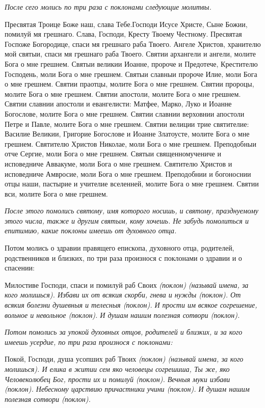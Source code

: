 \itshape После сего молись по три раза с поклонами следующие молитвы.\normalfont{}


Пресвятая Троице Боже наш, слава Тебе.Господи Исусе Христе, Сыне Божии, помилуй мя грешнаго. Слава, Господи, Кресту Твоему Честному. Пресвятая Госпоже Богородице, спаси мя грешнаго раба Твоего. Ангеле Христов, хранителю мой святыи, спаси мя грешнаго раба Твоего. Святии архангели и ангели, молите Бога о мне грешнем. Святыи великии Иоанне, пророче и Предотече, Крестителю Господень, моли Бога о мне грешнем. Святыи славныи пророче Илие, моли Бога о мне грешнем. Святии праотцы, молите Бога о мне грешнем. Святии пророцы, молите Бога о мне грешнем. Святии апостоли, молите Бога о мне грешнем. Святии славнии апостоли и евангелисти: Матфее, Марко, Луко и Иоанне Богослове, молите Бога о мне грешнем. Святии славнии верховнии апостоли Петре и Павле, молите Бога о мне грешнем. Святии велиции трие святителие: Василие Великии, Григорие Богослове и Иоанне Златоусте, молите Бога о мне грешнем. Святителю Христов Николае, моли Бога о мне грешнем. Преподобныи отче Сергие, моли Бога о мне грешнем. Святыи священномучениче и исповедниче Аввакуме, моли Бога о мне грешнем. Святителю Христов и исповедниче Амвросие, моли Бога о мне грешнем. Преподобнии и богоноснии отцы наши, пастырие и учителие вселенней, молите Бога о мне грешнем. Святии вси, молите Бога о мне грешнем.


\itshape После этого помолись святому, имя которого носишь, и святому, празднуемому этого числа, также и другим святым, кому хочешь. Не забудь помолиться и епитимию, какие поклоны имеешь от духовного отца.\normalfont{}


Потом молись о здравии правящего епископа, духовного отца, родителей, родственников и близких, по три раза произнося с поклонами о здравии и о спасении:


Милостиве Господи, спаси и помилуй раб Своих \itshape (поклон) (называй имена, за кого молишься)\normalfont{}. Избави их от всякия скорби, гнева и нужды \itshape (поклон)\normalfont{}. От всякия болезни душевныя и телесныя \itshape (поклон)\normalfont{}. И прости им всякое согрешение, вольное и невольное \itshape (поклон)\normalfont{}. И душам нашим полезная сотвори \itshape (поклон)\normalfont{}.


\itshape Потом помолись за упокой духовных отцов, родителей и близких, и за кого имеешь усердие, по три раза произнося с поклонами:\normalfont{}


Покой, Господи, душа усопших раб Твоих \itshape (поклон) (называй имена, за кого молишься)\normalfont{}. И елика в житии сем яко человецы согрешиша, Ты же, яко Человеколюбец Бог, прости их и помилуй \itshape (поклон)\normalfont{}. Вечныя муки избави \itshape (поклон)\normalfont{}. Небесному царствию причастники учини \itshape (поклон)\normalfont{}. И душам нашим полезная сотвори \itshape (поклон)\normalfont{}.


